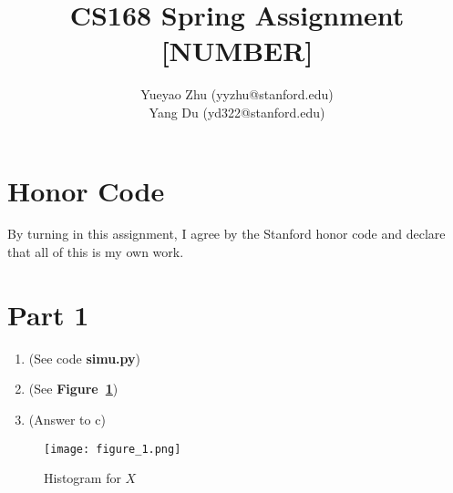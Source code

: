 \documentclass[12pt]{article}
\title{CS168 Spring Assignment [NUMBER]}
\author{
	Yueyao Zhu	(yyzhu@stanford.edu) \\
	Yang Du (yd322@stanford.edu)
}
\begin{document}
\maketitle

\section*{Honor Code}

By turning in this assignment, I agree by the Stanford honor code and declare
that all of this is my own work.

\section*{Part 1}

\begin{enumerate}[label=(\alph*)]
	\item (See code \textbf{simu.py})
	\item (See \textbf{Figure~\ref{fig:plot}})
  \item (Answer to c)
\end{enumerate}

\begin{figure}[h]
	\centering
	\texttt{[image: figure\_1.png]}
	\caption{Histogram for $X$}
	\label{fig:plot}
\end{figure}
\end{document}
